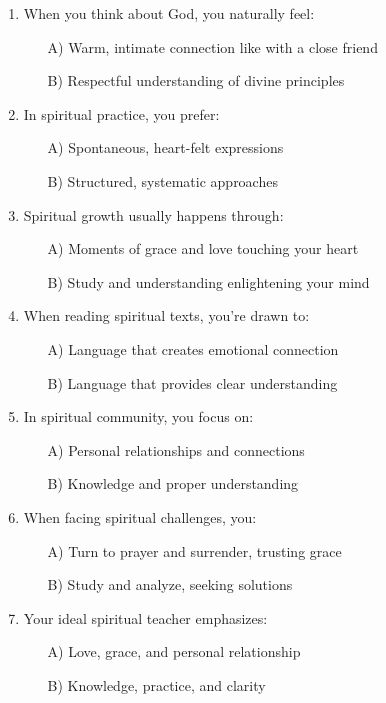 \documentclass[11pt,twoside]{book}
\begin{document}
\begin{enumerate}
\item When you think about God, you naturally feel:
\begin{itemize}
\item[A)] Warm, intimate connection like with a close friend
\item[B)] Respectful understanding of divine principles
\end{itemize}

\item In spiritual practice, you prefer:
\begin{itemize}
\item[A)] Spontaneous, heart-felt expressions
\item[B)] Structured, systematic approaches
\end{itemize}

\item Spiritual growth usually happens through:
\begin{itemize}
\item[A)] Moments of grace and love touching your heart
\item[B)] Study and understanding enlightening your mind
\end{itemize}

\item When reading spiritual texts, you're drawn to:
\begin{itemize}
\item[A)] Language that creates emotional connection
\item[B)] Language that provides clear understanding
\end{itemize}

\item In spiritual community, you focus on:
\begin{itemize}
\item[A)] Personal relationships and connections
\item[B)] Knowledge and proper understanding
\end{itemize}

\item When facing spiritual challenges, you:
\begin{itemize}
\item[A)] Turn to prayer and surrender, trusting grace
\item[B)] Study and analyze, seeking solutions
\end{itemize}

\item Your ideal spiritual teacher emphasizes:
\begin{itemize}
\item[A)] Love, grace, and personal relationship
\item[B)] Knowledge, practice, and clarity
\end{itemize}


\end{enumerate}
\end{document}
